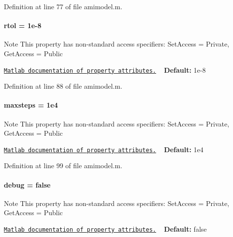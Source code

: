 Definition at line 77 of file amimodel.\+m.

\hypertarget{classamimodel_a7978e9a4674f869e6b2950e2f6262ca5}{}
\paragraph[{rtol}]{\setlength{\rightskip}{0pt plus 5cm}rtol = 1e-\/8}\label{classamimodel_a7978e9a4674f869e6b2950e2f6262ca5}
\begin{DoxyNote}{Note}
This property has non-\/standard access specifiers\+: {\ttfamily Set\+Access = Private, Get\+Access = Public} 

\href{http://www.mathworks.com/help/matlab/matlab_oop/property-attributes.html}{\tt Matlab documentation of property attributes.} ~\newline
{\bfseries Default\+:} 1e-\/8 
\end{DoxyNote}


Definition at line 88 of file amimodel.\+m.

\hypertarget{classamimodel_ac37622882dacee1f11688d4941ccb45e}{}
\paragraph[{maxsteps}]{\setlength{\rightskip}{0pt plus 5cm}maxsteps = 1e4}\label{classamimodel_ac37622882dacee1f11688d4941ccb45e}
\begin{DoxyNote}{Note}
This property has non-\/standard access specifiers\+: {\ttfamily Set\+Access = Private, Get\+Access = Public} 

\href{http://www.mathworks.com/help/matlab/matlab_oop/property-attributes.html}{\tt Matlab documentation of property attributes.} ~\newline
{\bfseries Default\+:} 1e4 
\end{DoxyNote}


Definition at line 99 of file amimodel.\+m.

\hypertarget{classamimodel_a0514aabed091ee5e2f35766eb01eced6}{}
\paragraph[{debug}]{\setlength{\rightskip}{0pt plus 5cm}debug = false}\label{classamimodel_a0514aabed091ee5e2f35766eb01eced6}
\begin{DoxyNote}{Note}
This property has non-\/standard access specifiers\+: {\ttfamily Set\+Access = Private, Get\+Access = Public} 

\href{http://www.mathworks.com/help/matlab/matlab_oop/property-attributes.html}{\tt Matlab documentation of property attributes.} ~\newline
{\bfseries Default\+:} false 
\end{DoxyNote}


